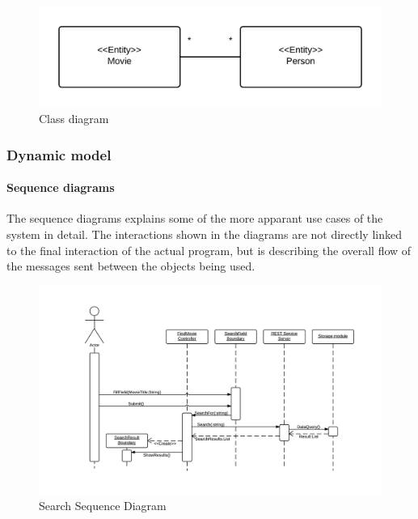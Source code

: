 \begin{figure}[h]
\includegraphics[width=\linewidth]{img/RAD/ClassDiagram.png}
\caption{Class diagram}
\label{fig:Class diagram}
\end{figure}

\newpage
\subsubsection{Dynamic model}

\paragraph{Sequence diagrams}

The sequence diagrams explains some of the more apparant use cases of the system in detail. The interactions shown in the diagrams are not directly linked to the final interaction of the actual program, but is describing the overall flow of the messages sent between the objects being used.

\begin{figure}[H]
\includegraphics[width=\linewidth]{img/RAD/SearchSequenceDiagram.png}
\caption{Search Sequence Diagram}
\label{fig:Search Sequence Diagram}
\end{figure}

